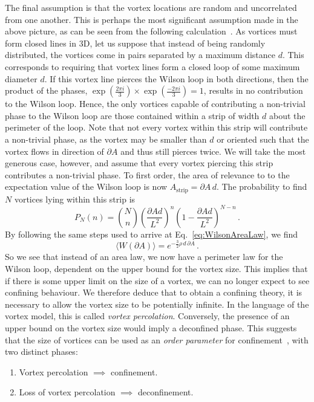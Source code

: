 The final assumption is that the vortex locations are random and uncorrelated from one another. This is perhaps the most significant assumption made in the above picture, as can be seen from the following calculation~\cite{Engelhardt:1999fd}. As vortices must form closed lines in 3D, let us suppose that instead of being randomly distributed, the vortices come in pairs separated by a maximum distance $d$. This corresponds to requiring that vortex lines form a closed loop of some maximum diameter $d$. If this vortex line pierces the Wilson loop in both directions, then the product of the phases, $\exp\left(\frac{2\pi i}{3}\right)\times \exp\left(\frac{-2\pi i}{3}\right) = 1$, results in no contribution to the Wilson loop. Hence, the only vortices capable of contributing a non-trivial phase to the Wilson loop are those contained within a strip of width $d$ about the perimeter of the loop. Note that not every vortex within this strip will contribute a non-trivial phase, as the vortex may be smaller than $d$ or oriented such that the vortex flows in direction of $\partial A$ and thus still pierces twice. We will take the most generous case, however, and assume that every vortex piercing this strip contributes a non-trivial phase. To first order, the area of relevance to to the expectation value of the Wilson loop is now $A_\text{strip}=\partial A\, d$. The probability to find $N$ vortices lying within this strip is 
%
\begin{equation}
P_N(n) = \binom{N}{n} \left(\frac{\partial A d}{L^2}\right)^n \left(1-\frac{\partial A d}{L^2}\right)^{N-n}\, .
\end{equation}
%
By following the same steps used to arrive at Eq.~\ref{eq:WilsonAreaLaw}, we find
%
\begin{equation}
\langle W(\partial A)\rangle = e^{-\frac{3}{2}\rho\, d\, \partial A}\, .
\end{equation}
%
So we see that instead of an area law, we now have a perimeter law for the Wilson loop, dependent on the upper bound for the vortex size. This implies that if there is some upper limit on the size of a vortex, we can no longer expect to see confining behaviour. We therefore deduce that to obtain a confining theory, it is necessary to allow the vortex size to be potentially infinite. In the language of the vortex model, this is called \textit{vortex percolation}. Conversely, the presence of an upper bound on the vortex size would imply a deconfined phase. This suggests that the size of vortices can be used as an \textit{order parameter} for confinement~\cite{Langfeld:1998cz}, with two distinct phases:
\begin{enumerate}
\item Vortex percolation $\implies$ confinement.
\item Loss of vortex percolation $\implies$ deconfinement.
\end{enumerate}

